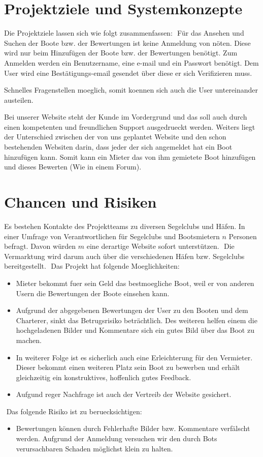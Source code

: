 \documentclass[12pt]{article}
\theoremstyle{definition}
\begin{document}
\section{Projektziele und Systemkonzepte}
Die Projektziele lassen sich wie folgt zusammenfassen:
​
Für das Ansehen und Suchen der Boote bzw. der Bewertungen ist keine Anmeldung von nöten. Diese wird nur beim Hinzufügen der Boote bzw. der Bewertungen benötigt.
Zum Anmelden werden ein Benutzername, eine e-mail und ein Passwort benötigt. Dem User wird eine Bestätigungs-email gesendet über diese er sich Verifizieren muss. 
\item Schnelles Fragenstellen moeglich, somit koennen sich auch die User untereinander austeilen.
\item Bei unserer Website steht der Kunde im Vordergrund und das soll auch durch einen kompetenten und freundlichen Support ausgedrueckt werden. 
​
Weiters liegt der Unterschied zwischen der von uns geplantet Website und den schon bestehenden Websiten darin, dass jeder der sich angemeldet hat ein Boot hinzufügen kann. Somit kann ein Mieter das von ihm gemietete Boot hinzufügen und dieses Bewerten (Wie in einem Forum).
​
\pagebreak
​
\section{Chancen und Risiken}
Es bestehen Kontakte des Projektteams zu diversen Segelclubs und Häfen. In einer Umfrage von Verantwortlichen für Segelclubs und Bootsmietern $n$ Personen befragt. Davon würden $m$ eine derartige Website sofort unterstützen. 
​
Die Vermarktung wird  darum auch über die verschiedenen Häfen bzw. Segelclubs bereitgestellt.
​
Das Projekt hat folgende Moeglichkeiten:
\begin{itemize}
\item Mieter bekommt fuer sein Geld das bestmoegliche Boot, weil er von anderen Usern die Bewertungen der Boote einsehen kann.
\item Aufgrund der abgegebenen Bewertungen der User zu den Booten und dem Charterer, sinkt das Betrugsrisiko beträchtlich. Des weiteren helfen einem die hochgeladenen Bilder und Kommentare sich ein gutes Bild über das Boot zu machen.
\item In weiterer Folge ist es sicherlich auch eine Erleichterung für den Vermieter. Dieser bekommt einen weiteren Platz sein Boot zu bewerben und erhält gleichzeitig ein konstruktives, hoffenlich gutes Feedback.
\item Aufgund reger Nachfrage ist auch der Vertreib der Website gesichert.
\end{itemize}
​
Das folgende Risiko ist zu beruecksichtigen:
\begin{itemize}
\item Bewertungen können durch Fehlerhafte Bilder bzw. Kommentare verfälscht werden. Aufgrund der Anmeldung versuchen wir den durch Bots verursachbaren Schaden möglichst klein zu halten.
\end{itemize}
​
\pagebreak
​
\end{document}
